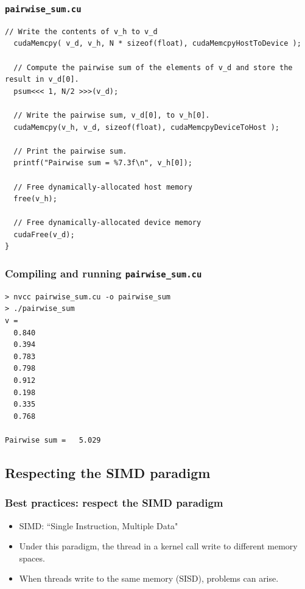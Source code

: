 \documentclass[handout]{beamer}
\numberwithin{equation}{section}
\begin{document}
\begin{frame}[fragile]
\frametitle{{\tt pairwise\_sum.cu}} \lstset{basicstyle=\tiny}
\begin{lstlisting}[name=psum]
  // Write the contents of v_h to v_d
  cudaMemcpy( v_d, v_h, N * sizeof(float), cudaMemcpyHostToDevice );
  
  // Compute the pairwise sum of the elements of v_d and store the result in v_d[0].
  psum<<< 1, N/2 >>>(v_d);
  
  // Write the pairwise sum, v_d[0], to v_h[0].
  cudaMemcpy(v_h, v_d, sizeof(float), cudaMemcpyDeviceToHost );

  // Print the pairwise sum.
  printf("Pairwise sum = %7.3f\n", v_h[0]);
  
  // Free dynamically-allocated host memory
  free(v_h);

  // Free dynamically-allocated device memory    
  cudaFree(v_d);
}
\end{lstlisting}
\end{frame}

\begin{frame}[fragile]
\frametitle{Compiling and running {\tt pairwise\_sum.cu}}
\begin{lstlisting}
> nvcc pairwise_sum.cu -o pairwise_sum
> ./pairwise_sum
v =
  0.840
  0.394
  0.783
  0.798
  0.912
  0.198
  0.335
  0.768
  
Pairwise sum =   5.029
\end{lstlisting}
\end{frame}


\subsection{Respecting the SIMD paradigm}

\begin{frame}
\frametitle{Best practices: respect the SIMD paradigm}
\begin{itemize}
\pause \item SIMD: ``Single Instruction, Multiple Data"
\pause \item Under this paradigm, the thread in a kernel call write to different memory spaces.
\pause \item When threads write to the same memory (SISD), problems can arise.
\end{itemize}
\end{frame}
\end{document}
